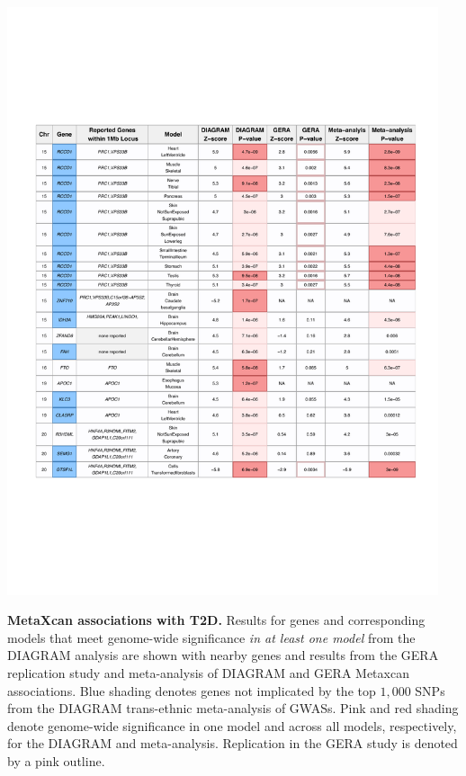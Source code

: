 \documentclass[10pt]{article}
\begin{document}
\begin{table}
\ContinuedFloat
\includegraphics[width=0.95\textwidth]{table1_part4.pdf}
\caption{\textbf{MetaXcan associations with T2D.} Results for genes and corresponding models that meet genome-wide significance \textit{in at least one model} from the DIAGRAM analysis are shown with nearby genes and results from the GERA replication study and meta-analysis of DIAGRAM and GERA Metaxcan associations. Blue shading denotes genes not implicated by the top $1,000$ SNPs from the DIAGRAM trans-ethnic meta-analysis of GWASs. Pink and red shading denote genome-wide significance in one model and across all models, respectively, for the DIAGRAM and meta-analysis. Replication in the GERA study is denoted by a pink outline.} \label{tab:table1.part4}
\end{table}
\end{document}

